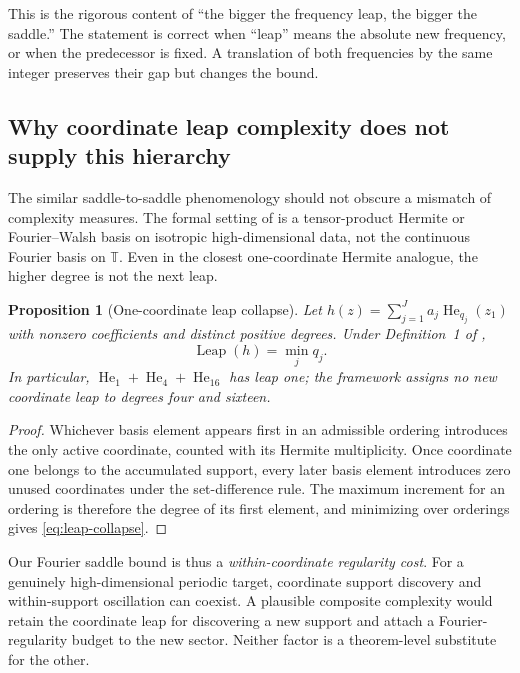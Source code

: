 \documentclass[11pt]{article}
\newcommand{\T}{\mathbb T}
\newcommand{\1}{\mathbf 1}
\theoremstyle{plain}
\newtheorem{proposition}[theorem]{Proposition}
\theoremstyle{definition}
\begin{document}
This is the rigorous content of ``the bigger the frequency leap, the bigger
the saddle.''  The statement is correct when ``leap'' means the absolute new
frequency, or when the predecessor is fixed.  A translation of both
frequencies by the same integer preserves their gap but changes the bound.

\subsection{Why coordinate leap complexity does not supply this hierarchy}

The similar saddle-to-saddle phenomenology should not obscure a mismatch of
complexity measures.  The formal setting of \citet{abbe2023leap} is a
tensor-product Hermite or Fourier--Walsh basis on isotropic high-dimensional
data, not the continuous Fourier basis on \(\T\).  Even in the closest
one-coordinate Hermite analogue, the higher degree is not the next leap.

\begin{proposition}[One-coordinate leap collapse]
\label{prop:leap-collapse}
Let
\(
 h(z)=\sum_{j=1}^J a_j\operatorname{He}_{q_j}(z_1)
\)
with nonzero coefficients and distinct positive degrees.  Under
Definition~1 of \citet{abbe2023leap},
\begin{equation}
 \operatorname{Leap}(h)=\min_j q_j.
 \label{eq:leap-collapse}
\end{equation}
In particular,
\(\operatorname{He}_1+\operatorname{He}_4+\operatorname{He}_{16}\) has
leap one; the framework assigns no new coordinate leap to degrees four and
sixteen.
\end{proposition}

\begin{proof}
Whichever basis element appears first in an admissible ordering introduces
the only active coordinate, counted with its Hermite multiplicity.  Once
coordinate one belongs to the accumulated support, every later basis
element introduces zero unused coordinates under the set-difference rule.
The maximum increment for an ordering is therefore the degree of its first
element, and minimizing over orderings gives \eqref{eq:leap-collapse}.
\end{proof}

Our Fourier saddle bound is thus a \emph{within-coordinate regularity cost}.
For a genuinely high-dimensional periodic target, coordinate support
discovery and within-support oscillation can coexist.  A plausible composite
complexity would retain the coordinate leap for discovering a new support
and attach a Fourier-regularity budget to the new sector.  Neither factor is
a theorem-level substitute for the other.
\end{document}
